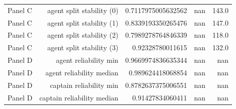 \documentclass{article}
\begin{document}
\begin{tabular}{lrrrr}
Panel C & agent split stability (0) & 0.7117975005632562 & nan & 143.0 \\
Panel C & agent split stability (1) & 0.8339193350265476 & nan & 147.0 \\
Panel C & agent split stability (2) & 0.7989278764846339 & nan & 118.0 \\
Panel C & agent split stability (3) & 0.92328780011615 & nan & 132.0 \\
Panel D & agent reliability min & 0.9669974836635344 & nan & nan \\
Panel D & agent reliability median & 0.989624418068854 & nan & nan \\
Panel D & captain reliability min & 0.8782637375006551 & nan & nan \\
Panel D & captain reliability median & 0.91427834060411 & nan & nan \\
\hline
\end{tabular}
\end{document}
